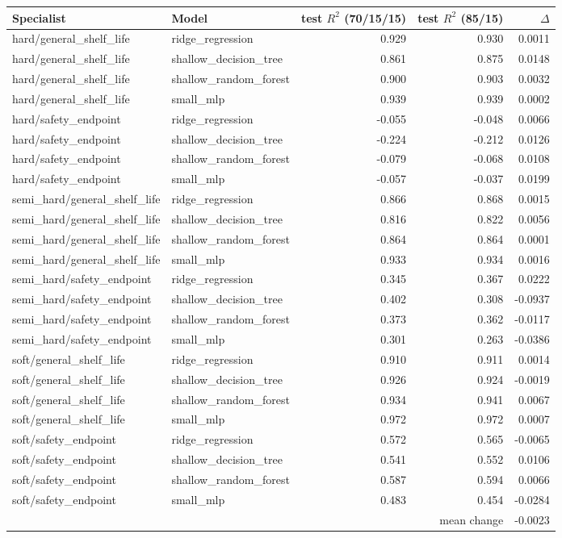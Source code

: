 \begin{tabular}{llrrr}
\toprule
Specialist & Model & test $R^2$ (70/15/15) & test $R^2$ (85/15) & $\Delta$ \\
\midrule
hard/general\_shelf\_life & ridge\_regression & 0.929 & 0.930 & 0.0011 \\
hard/general\_shelf\_life & shallow\_decision\_tree & 0.861 & 0.875 & 0.0148 \\
hard/general\_shelf\_life & shallow\_random\_forest & 0.900 & 0.903 & 0.0032 \\
hard/general\_shelf\_life & small\_mlp & 0.939 & 0.939 & 0.0002 \\
hard/safety\_endpoint & ridge\_regression & -0.055 & -0.048 & 0.0066 \\
hard/safety\_endpoint & shallow\_decision\_tree & -0.224 & -0.212 & 0.0126 \\
hard/safety\_endpoint & shallow\_random\_forest & -0.079 & -0.068 & 0.0108 \\
hard/safety\_endpoint & small\_mlp & -0.057 & -0.037 & 0.0199 \\
semi\_hard/general\_shelf\_life & ridge\_regression & 0.866 & 0.868 & 0.0015 \\
semi\_hard/general\_shelf\_life & shallow\_decision\_tree & 0.816 & 0.822 & 0.0056 \\
semi\_hard/general\_shelf\_life & shallow\_random\_forest & 0.864 & 0.864 & 0.0001 \\
semi\_hard/general\_shelf\_life & small\_mlp & 0.933 & 0.934 & 0.0016 \\
semi\_hard/safety\_endpoint & ridge\_regression & 0.345 & 0.367 & 0.0222 \\
semi\_hard/safety\_endpoint & shallow\_decision\_tree & 0.402 & 0.308 & -0.0937 \\
semi\_hard/safety\_endpoint & shallow\_random\_forest & 0.373 & 0.362 & -0.0117 \\
semi\_hard/safety\_endpoint & small\_mlp & 0.301 & 0.263 & -0.0386 \\
soft/general\_shelf\_life & ridge\_regression & 0.910 & 0.911 & 0.0014 \\
soft/general\_shelf\_life & shallow\_decision\_tree & 0.926 & 0.924 & -0.0019 \\
soft/general\_shelf\_life & shallow\_random\_forest & 0.934 & 0.941 & 0.0067 \\
soft/general\_shelf\_life & small\_mlp & 0.972 & 0.972 & 0.0007 \\
soft/safety\_endpoint & ridge\_regression & 0.572 & 0.565 & -0.0065 \\
soft/safety\_endpoint & shallow\_decision\_tree & 0.541 & 0.552 & 0.0106 \\
soft/safety\_endpoint & shallow\_random\_forest & 0.587 & 0.594 & 0.0066 \\
soft/safety\_endpoint & small\_mlp & 0.483 & 0.454 & -0.0284 \\
\midrule
\multicolumn{4}{r}{mean change} & -0.0023 \\
\bottomrule
\end{tabular}